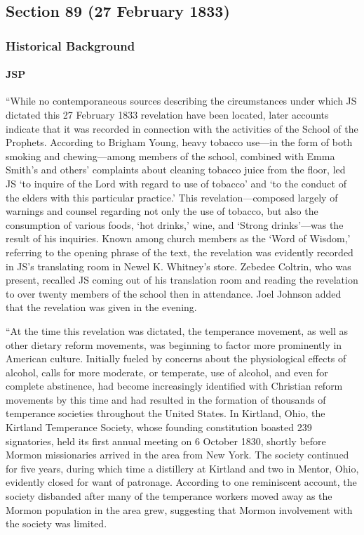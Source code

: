 \subsection{Section 89 (27 February 1833)}
	\label{DC89}
	
	\subsubsection{Historical Background}
		\label{DC89-HB}
		
		\paragraph{JSP}
		
			``While no contemporaneous sources describing the circumstances under which JS dictated this 27 February 1833 revelation have been located, later accounts indicate that it was recorded in connection with the activities of the School of the Prophets. According to Brigham Young, heavy tobacco use---in the form of both smoking and chewing---among members of the school, combined with Emma Smith's and others' complaints about cleaning tobacco juice from the floor, led JS `to inquire of the Lord with regard to use of tobacco' and `to the conduct of the elders with this particular practice.' This revelation---composed largely of warnings and counsel regarding not only the use of tobacco, but also the consumption of various foods, `hot drinks,' wine, and `Strong drinks'---was the result of his inquiries. Known among church members as the `Word of Wisdom,' referring to the opening phrase of the text, the revelation was evidently recorded in JS's translating room in Newel K. Whitney's store. Zebedee Coltrin, who was present, recalled JS coming out of his translation room and reading the revelation to over twenty members of the school then in attendance. Joel Johnson added that the revelation was given in the evening.
			
			``At the time this revelation was dictated, the temperance movement, as well as other dietary reform movements, was beginning to factor more prominently in American culture. Initially fueled by concerns about the physiological effects of alcohol, calls for more moderate, or temperate, use of alcohol, and even for complete abstinence, had become increasingly identified with Christian reform movements by this time and had resulted in the formation of thousands of temperance societies throughout the United States. In Kirtland, Ohio, the Kirtland Temperance Society, whose founding constitution boasted 239 signatories, held its first annual meeting on 6 October 1830, shortly before Mormon missionaries arrived in the area from New York. The society continued for five years, during which time a distillery at Kirtland and two in Mentor, Ohio, evidently closed for want of patronage. According to one reminiscent account, the society disbanded after many of the temperance workers moved away as the Mormon population in the area grew, suggesting that Mormon involvement with the society was limited.

